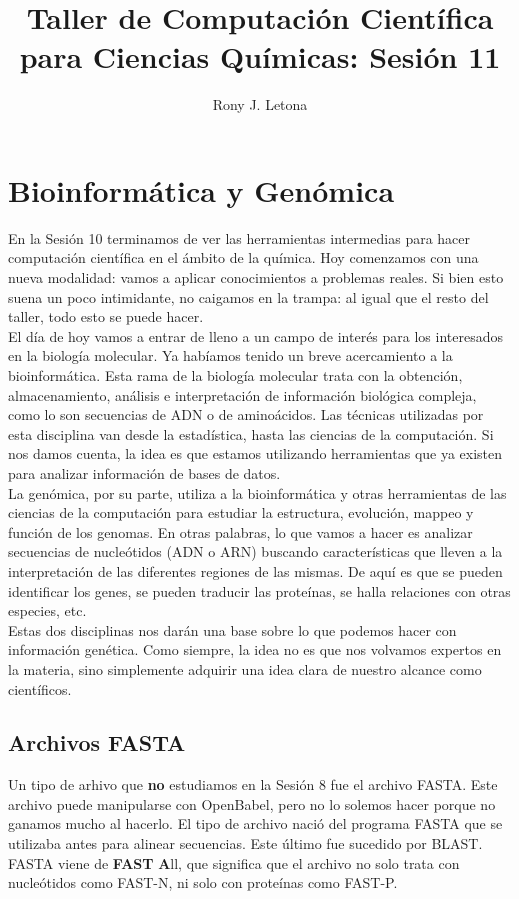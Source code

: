 \documentclass[10pt,letterpaper]{article}
\author{Rony J. Letona}
\title{Taller de Computaci\'on Cient\'ifica para Ciencias Qu\'imicas: Sesi\'on 11}
\begin{document}
\maketitle

\section{Bioinform\'atica y Gen\'omica}
En la Sesi\'on 10 terminamos de ver las herramientas intermedias para hacer computaci\'on cient\'ifica en el \'ambito de la qu\'imica. Hoy comenzamos con una nueva modalidad: vamos a aplicar conocimientos a problemas reales. Si bien esto suena un poco intimidante, no caigamos en la trampa: al igual que el resto del taller, todo esto se puede hacer.\\

El d\'ia de hoy vamos a entrar de lleno a un campo de inter\'es para los interesados en la biolog\'ia molecular. Ya hab\'iamos tenido un breve acercamiento a la bioinform\'atica. Esta rama de la biolog\'ia molecular trata con la obtenci\'on, almacenamiento, an\'alisis e interpretaci\'on de informaci\'on biol\'ogica compleja, como lo son secuencias de ADN o de amino\'acidos. Las t\'ecnicas utilizadas por esta disciplina van desde la estad\'istica, hasta las ciencias de la computaci\'on. Si nos damos cuenta, la idea es que estamos utilizando herramientas que ya existen para analizar informaci\'on de bases de datos.\\

La gen\'omica, por su parte, utiliza a la bioinform\'atica y otras herramientas de las ciencias de la computaci\'on para estudiar la estructura, evoluci\'on, mappeo y funci\'on de los genomas. En otras palabras, lo que vamos a hacer es analizar secuencias de nucle\'otidos (ADN o ARN) buscando caracter\'isticas que lleven a la interpretaci\'on de las diferentes regiones de las mismas. De aqu\'i es que se pueden identificar los genes, se pueden traducir las prote\'inas, se halla relaciones con otras especies, etc.\\

Estas dos disciplinas nos dar\'an una base sobre lo que podemos hacer con informaci\'on gen\'etica. Como siempre, la idea no es que nos volvamos expertos en la materia, sino simplemente adquirir una idea clara de nuestro alcance como cient\'ificos.

\subsection{Archivos FASTA}
Un tipo de arhivo que \textbf{no} estudiamos en la Sesi\'on 8 fue el archivo FASTA. Este archivo puede manipularse con OpenBabel, pero no lo solemos hacer porque no ganamos mucho al hacerlo. El tipo de archivo naci\'o del programa FASTA que se utilizaba antes para alinear secuencias. Este \'ultimo fue sucedido por BLAST. FASTA viene de \textbf{FAST} \textbf{A}ll, que significa que el archivo no solo trata con nucle\'otidos como FAST-N, ni solo con prote\'inas como FAST-P.\\
\end{document}
